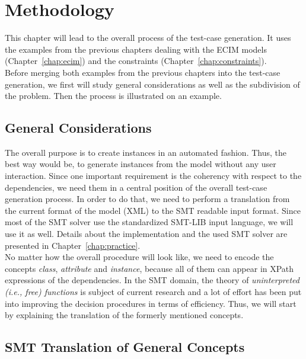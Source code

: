 \chapter{Methodology}\label{chap:methodology}

This chapter will lead to the overall process of the test-case generation. It uses the examples from the previous chapters dealing with the ECIM models (Chapter~\ref{chap:ecim}) and the constraints (Chapter~\ref{chap:constraints}). \\

Before merging both examples from the previous chapters into the test-case generation, we first will study general considerations as well as the subdivision of the problem. Then the process is illustrated on an example.

\section{General Considerations}\label{sec:general}

The overall purpose is to create instances in an automated fashion. Thus, the best way would be, to generate instances from the model without any user interaction. Since one important requirement is the coherency with respect to the dependencies, we need them in a central position of the overall test-case generation process. 
In order to do that, we need to perform a translation from the current format of the model (XML) to the SMT readable input format. Since most of the SMT solver use the standardized SMT-LIB input language, we will use it as well. Details about the implementation and the used SMT solver are presented in Chapter~\ref{chap:practice}.\\

No matter how the overall procedure will look like, we need to encode the concepts \emph{class}, \emph{attribute} and \emph{instance}, because all of them can appear in XPath expressions of the dependencies. In the SMT domain, the theory of \emph{uninterpreted (i.e., free) functions} is subject of current research and a lot of effort has been put into improving the decision procedures in terms of efficiency. Thus, we will start by explaining the translation of the formerly mentioned concepts.

\section{SMT Translation of General Concepts}\label{sec:smt-transl-general}


